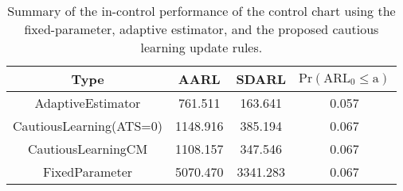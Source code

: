 \begin{table}[!h]

\caption{Summary of the in-control performance of the control chart using the fixed-parameter, adaptive estimator, and the proposed cautious learning update rules.}
\centering
\begin{tabular}[t]{cccc}
\toprule
Type & AARL & SDARL & $\text{Pr}(\text{ARL}_0 \leq \text{a})$\\
\midrule
AdaptiveEstimator & 761.511 & 163.641 & 0.057\\
CautiousLearning(ATS=0) & 1148.916 & 385.194 & 0.067\\
CautiousLearningCM & 1108.157 & 347.546 & 0.067\\
FixedParameter & 5070.470 & 3341.283 & 0.067\\
\bottomrule
\end{tabular}
\end{table}
